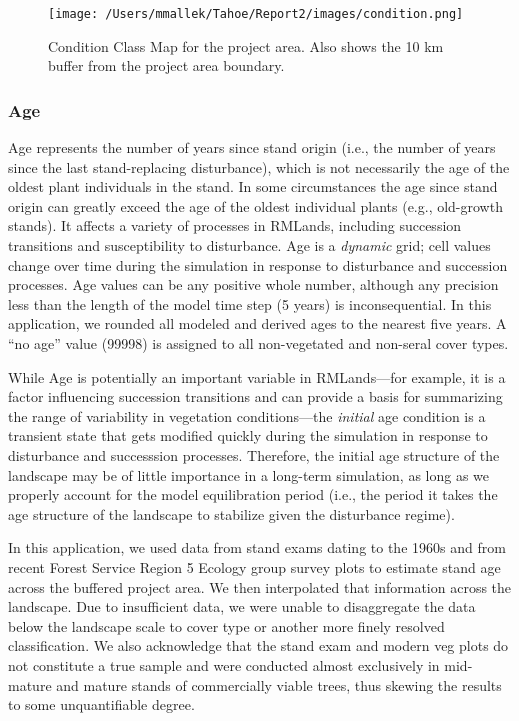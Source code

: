 \begin{figure}[!htbp]
\centering
\texttt{[image: /Users/mmallek/Tahoe/Report2/images/condition.png]}
\caption{Condition Class Map for the project area. Also shows the 10 km buffer from the project area boundary.} 
\label{conditionmap}
\end{figure}

\subsubsection{Age}
Age represents the number of years since stand origin (i.e., the number of years since the last stand-replacing disturbance), which is not necessarily the age of the oldest plant individuals in the stand. In some circumstances the age since stand origin can greatly exceed the age of the oldest individual plants (e.g., old-growth stands). It affects a variety of processes in RMLands, including succession transitions and susceptibility to disturbance. Age is a \emph{dynamic} grid; cell values change over time during the simulation in response to disturbance and succession processes. Age values can be any positive whole number, although any precision less than the length of the model time step (5 years) is inconsequential. In this application, we rounded all modeled and derived ages to the nearest five years. A ``no age'' value (99998) is assigned to all non-vegetated and non-seral cover types.

While Age is potentially an important variable in RMLands---for example, it is a factor influencing succession transitions and can provide a basis for summarizing the range of variability in vegetation conditions---the \emph{initial} age condition is a transient state that gets modified quickly during the simulation in response to disturbance and successsion processes. Therefore, the initial age structure of the landscape may be of little importance in a long-term simulation, as long as we properly account for the model equilibration period (i.e., the period it takes the age structure of the landscape to stabilize given the disturbance regime).

In this application, we used data from stand exams dating to the 1960s and from recent Forest Service Region 5 Ecology group survey plots to estimate stand age across the buffered project area. We then interpolated that information across the landscape. Due to insufficient data, we were unable to disaggregate the data below the landscape scale to cover type or another more finely resolved classification. We also acknowledge that the stand exam and modern veg plots do not constitute a true sample and were conducted almost exclusively in mid-mature and mature stands of commercially viable trees, thus skewing the results to some unquantifiable degree.

